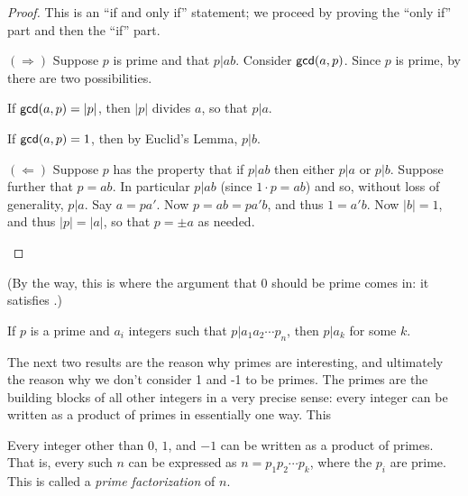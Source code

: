 \begin{proof}
This is an ``if and only if'' statement; we proceed by proving the ``only if'' part and then the ``if'' part.
\begin{proplist}
\item[\((\Rightarrow)\)] Suppose \(p\) is prime and that \(p|ab\).
Consider \(\mathsf{gcd}(a, p)\).
Since \(p\) is prime, by  there are two possibilities.
\begin{proplist}
\item If \(\mathsf{gcd}(a, p) = |p|\), then \(|p|\) divides \(a\), so that \(p|a\).
\item If \(\mathsf{gcd}(a, p) = 1\), then by Euclid's Lemma, \(p|b\).
\end{proplist}

\item[\((\Leftarrow)\)] Suppose \(p\) has the property that if \(p|ab\) then either \(p|a\) or \(p|b\).
Suppose further that \(p = ab\).
In particular \(p|ab\) (since \(1 \cdot p = ab\)) and so, without loss of generality, \(p|a\).
Say \(a = pa'\).
Now \(p = ab = pa'b\), and thus \(1 = a'b\).
Now \(|b| = 1\), and thus \(|p| = |a|\), so that \(p = \pm a\) as needed.
\qedhere
\end{proplist}
\end{proof}

(By the way, this is where the argument that 0 should be prime comes in: it satisfies .)

\begin{cor}
If \(p\) is a prime and \(a_i\) integers such that \(p|a_1a_2 \cdots p_n\), then \(p|a_k\) for some \(k\).
\end{cor}

The next two results are the reason why primes are interesting, and ultimately the reason why we don't consider 1 and -1 to be primes.
The primes are the building blocks of all other integers in a very precise sense: every integer can be written as a product of primes in essentially one way.
This 

\begin{thm}
Every integer other than \(0\), \(1\), and \(-1\) can be written as a product of primes.
That is, every such \(n\) can be expressed as \(n = p_1p_2 \cdots p_k\), where the \(p_i\) are prime.
This is called a \emph{prime factorization} of \(n\).
\end{thm}

